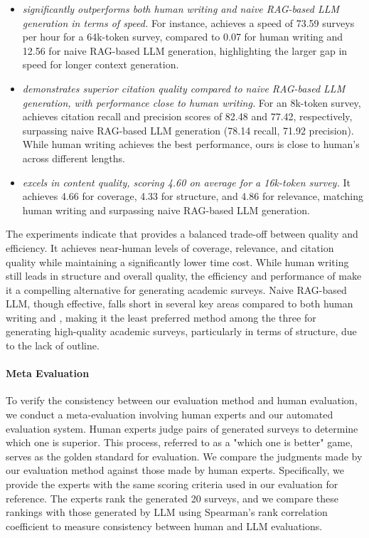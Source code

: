 \begin{itemize}
    \item \textit{\ourmethod significantly outperforms both human writing and naive RAG-based LLM generation in terms of speed.} For instance, \ourmethod achieves a speed of 73.59 surveys per hour for a 64k-token survey, compared to 0.07 for human writing and 12.56 for naive RAG-based LLM generation, highlighting the larger gap in speed for longer context generation.
    \item \textit{\ourmethod demonstrates superior citation quality compared to naive RAG-based LLM generation, with performance close to human writing.} For an 8k-token survey, \ourmethod achieves citation recall and precision scores of 82.48 and 77.42, respectively, surpassing naive RAG-based LLM generation (78.14 recall, 71.92 precision). While human writing achieves the best performance, ours is close to human's across different lengths.
    
    \item \textit{\ourmethod excels in content quality, scoring 4.60 on average for a 16k-token survey.} It achieves 4.66 for coverage, 4.33 for structure, and 4.86 for relevance, matching human writing and surpassing naive RAG-based LLM generation.

\end{itemize}

The experiments indicate that \ourmethod provides a balanced trade-off between quality and efficiency. It achieves near-human levels of coverage, relevance, and citation quality while maintaining a significantly lower time cost. While human writing still leads in structure and overall quality, the efficiency and performance of \ourmethod make it a compelling alternative for generating academic surveys. Naive RAG-based LLM, though effective, falls short in several key areas compared to both human writing and \ourmethod, making it the least preferred method among the three for generating high-quality academic surveys, particularly in terms of structure, due to the lack of outline.

\paragraph{Meta Evaluation}
To verify the consistency between our evaluation method and human evaluation, we conduct a meta-evaluation involving human experts and our automated evaluation system. Human experts judge pairs of generated surveys to determine which one is superior. This process, referred to as a "which one is better" game, serves as the golden standard for evaluation. We compare the judgments made by our evaluation method against those made by human experts. Specifically, we provide the experts with the same scoring criteria used in our evaluation for reference. The experts rank the generated 20 surveys, and we compare these rankings with those generated by LLM using Spearman’s rank correlation coefficient to measure consistency between human and LLM evaluations.

